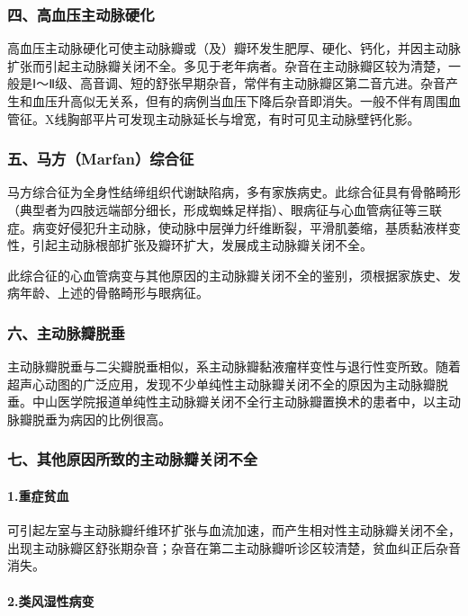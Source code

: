 \subsubsection{四、高血压主动脉硬化}

高血压主动脉硬化可使主动脉瓣或（及）瓣环发生肥厚、硬化、钙化，并因主动脉扩张而引起主动脉瓣关闭不全。多见于老年病者。杂音在主动脉瓣区较为清楚，一般是Ⅰ～Ⅱ级、高音调、短的舒张早期杂音，常伴有主动脉瓣区第二音亢进。杂音产生和血压升高似无关系，但有的病例当血压下降后杂音即消失。一般不伴有周围血管征。X线胸部平片可发现主动脉延长与增宽，有时可见主动脉壁钙化影。

\subsubsection{五、马方（Marfan）综合征}

马方综合征为全身性结缔组织代谢缺陷病，多有家族病史。此综合征具有骨骼畸形（典型者为四肢远端部分细长，形成蜘蛛足样指）、眼病征与心血管病征等三联症。病变好侵犯升主动脉，使动脉中层弹力纤维断裂，平滑肌萎缩，基质黏液样变性，引起主动脉根部扩张及瓣环扩大，发展成主动脉瓣关闭不全。

此综合征的心血管病变与其他原因的主动脉瓣关闭不全的鉴别，须根据家族史、发病年龄、上述的骨骼畸形与眼病征。

\subsubsection{六、主动脉瓣脱垂}

主动脉瓣脱垂与二尖瓣脱垂相似，系主动脉瓣黏液瘤样变性与退行性变所致。随着超声心动图的广泛应用，发现不少单纯性主动脉瓣关闭不全的原因为主动脉瓣脱垂。中山医学院报道单纯性主动脉瓣关闭不全行主动脉瓣置换术的患者中，以主动脉瓣脱垂为病因的比例很高。

\subsubsection{七、其他原因所致的主动脉瓣关闭不全}

\paragraph{1.重症贫血}

可引起左室与主动脉瓣纤维环扩张与血流加速，而产生相对性主动脉瓣关闭不全，出现主动脉瓣区舒张期杂音；杂音在第二主动脉瓣听诊区较清楚，贫血纠正后杂音消失。

\paragraph{2.类风湿性病变}

